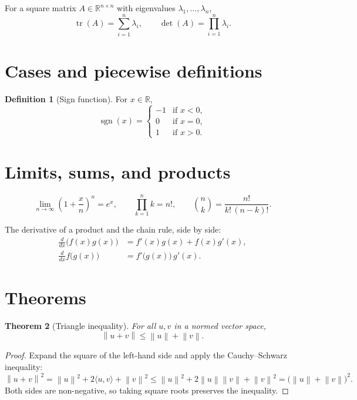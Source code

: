 \documentclass[11pt,a4paper]{article}
\theoremstyle{plain}
\newtheorem{theorem}{Theorem}[section]
\theoremstyle{definition}
\newtheorem{definition}[theorem]{Definition}
\theoremstyle{remark}
\newcommand{\R}{\mathbb{R}}
\newcommand{\norm}[1]{\left\lVert #1 \right\rVert}
\DeclareMathOperator{\tr}{tr}
\begin{document}
For a square matrix $A \in \R^{n \times n}$ with eigenvalues
$\lambda_{1}, \dots, \lambda_{n}$,
\[
  \tr(A) = \sum_{i=1}^{n} \lambda_{i},
  \qquad
  \det(A) = \prod_{i=1}^{n} \lambda_{i}.
\]

\section{Cases and piecewise definitions}

\begin{definition}[Sign function]
For $x \in \R$,
\[
  \operatorname{sgn}(x) =
  \begin{cases}
    -1 & \text{if } x < 0, \\
     0 & \text{if } x = 0, \\
     1 & \text{if } x > 0.
  \end{cases}
\]
\end{definition}

\section{Limits, sums, and products}

\[
  \lim_{n \to \infty} \left( 1 + \frac{x}{n} \right)^{n} = e^{x},
  \qquad
  \prod_{k=1}^{n} k = n!,
  \qquad
  \binom{n}{k} = \frac{n!}{k!\,(n-k)!}.
\]

The derivative of a product and the chain rule, side by side:
\begin{align*}
  \frac{d}{dx}\bigl( f(x)g(x) \bigr) &= f'(x)g(x) + f(x)g'(x), \\
  \frac{d}{dx} f\bigl( g(x) \bigr)   &= f'\bigl( g(x) \bigr)\, g'(x).
\end{align*}

\section{Theorems}

\begin{theorem}[Triangle inequality]
\label{thm:triangle}
For all $u, v$ in a normed vector space,
\[
  \norm{u + v} \le \norm{u} + \norm{v}.
\]
\end{theorem}

\begin{proof}
Expand the square of the left-hand side and apply the Cauchy--Schwarz
inequality:
\[
  \norm{u + v}^{2}
    = \norm{u}^{2} + 2\langle u, v \rangle + \norm{v}^{2}
    \le \norm{u}^{2} + 2\norm{u}\norm{v} + \norm{v}^{2}
    = \bigl( \norm{u} + \norm{v} \bigr)^{2}.
\]
Both sides are non-negative, so taking square roots preserves the inequality.
\end{proof}
\end{document}
